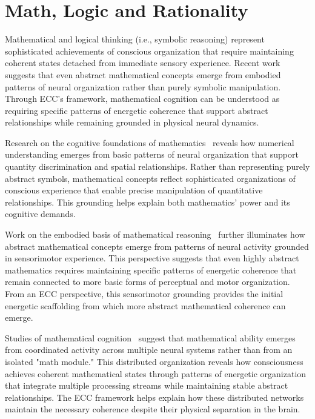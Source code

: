 \section{Math, Logic and Rationality}

Mathematical and logical thinking (i.e., symbolic reasoning) represent sophisticated achievements of conscious organization that require maintaining coherent states detached from immediate sensory experience. Recent work~\cite{Lakoff2000, pinotsis2023cytoelectric} suggests that even abstract mathematical concepts emerge from embodied patterns of neural organization rather than purely symbolic manipulation. Through ECC's framework, mathematical cognition can be understood as requiring specific patterns of energetic coherence that support abstract relationships while remaining grounded in physical neural dynamics.

Research on the cognitive foundations of mathematics~\cite{Dehaene2011b, kukushkin2024massed} reveals how numerical understanding emerges from basic patterns of neural organization that support quantity discrimination and spatial relationships. Rather than representing purely abstract symbols, mathematical concepts reflect sophisticated organizations of conscious experience that enable precise manipulation of quantitative relationships. This grounding helps explain both mathematics' power and its cognitive demands.

Work on the embodied basis of mathematical reasoning~\cite{Lakoff2000, hunt2024electromagnetic} further illuminates how abstract mathematical concepts emerge from patterns of neural activity grounded in sensorimotor experience. This perspective suggests that even highly abstract mathematics requires maintaining specific patterns of energetic coherence that remain connected to more basic forms of perceptual and motor organization. From an ECC perspective, this sensorimotor grounding provides the initial energetic scaffolding from which more abstract mathematical coherence can emerge.

Studies of mathematical cognition~\cite{Devlin2000, amil2024theta} suggest that mathematical ability emerges from coordinated activity across multiple neural systems rather than from an isolated "math module." This distributed organization reveals how consciousness achieves coherent mathematical states through patterns of energetic organization that integrate multiple processing streams while maintaining stable abstract relationships. The ECC framework helps explain how these distributed networks maintain the necessary coherence despite their physical separation in the brain.

